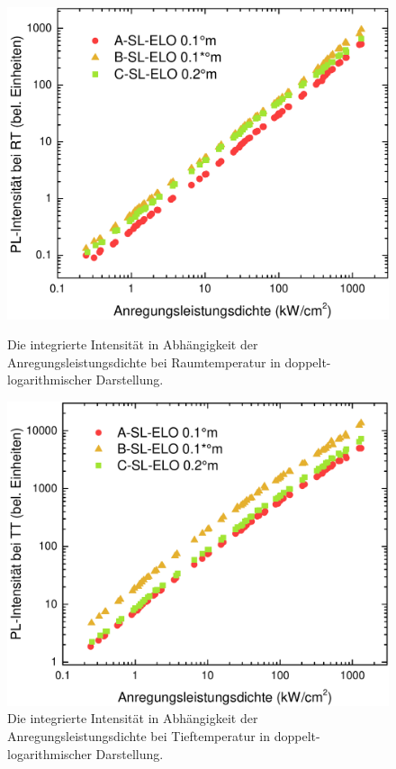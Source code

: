 \begin{figure}[htb]
  \centering
  \begin{minipage}[t]{0.49\textwidth}
    \centering
    \includegraphics[width=\textwidth]{Bilder/TS4048/intRT.pdf}
		\caption{Die integrierte Intensität in Abhängigkeit der Anregungsleistungsdichte bei Raumtemperatur in doppelt-logarithmischer Darstellung.}
    \label{fig:sleloINTrt}
  \end{minipage}
  \begin{minipage}[t]{0.5\textwidth}
    \centering
    \includegraphics[width=\linewidth]{Bilder/TS4048/intTT.pdf}
		\caption{Die integrierte Intensität in Abhängigkeit der Anregungsleistungsdichte bei Tieftemperatur in doppelt-logarithmischer Darstellung.}
		\label{fig:sleloINTtt}
  \end{minipage}
\end{figure}
